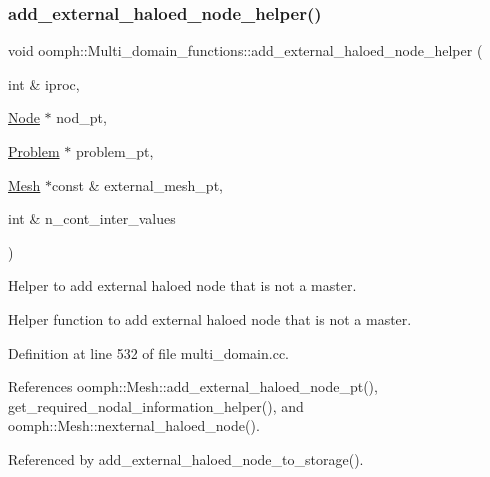 \subsubsection{\texorpdfstring{add\+\_\+external\+\_\+haloed\+\_\+node\+\_\+helper()}{add\_external\_haloed\_node\_helper()}}
{\footnotesize\ttfamily void oomph\+::\+Multi\+\_\+domain\+\_\+functions\+::add\+\_\+external\+\_\+haloed\+\_\+node\+\_\+helper (\begin{DoxyParamCaption}\item[{int \&}]{iproc,  }\item[{\hyperlink{classoomph_1_1Node}{Node} $\ast$}]{nod\+\_\+pt,  }\item[{\hyperlink{classoomph_1_1Problem}{Problem} $\ast$}]{problem\+\_\+pt,  }\item[{\hyperlink{classoomph_1_1Mesh}{Mesh} $\ast$const \&}]{external\+\_\+mesh\+\_\+pt,  }\item[{int \&}]{n\+\_\+cont\+\_\+inter\+\_\+values }\end{DoxyParamCaption})}



Helper to add external haloed node that is not a master. 

Helper function to add external haloed node that is not a master. 

Definition at line 532 of file multi\+\_\+domain.\+cc.



References oomph\+::\+Mesh\+::add\+\_\+external\+\_\+haloed\+\_\+node\+\_\+pt(), get\+\_\+required\+\_\+nodal\+\_\+information\+\_\+helper(), and oomph\+::\+Mesh\+::nexternal\+\_\+haloed\+\_\+node().



Referenced by add\+\_\+external\+\_\+haloed\+\_\+node\+\_\+to\+\_\+storage().

\mbox{\label{namespaceoomph_1_1Multi__domain__functions_aea9c2b1984158b8f560c6fff7c0adea7}} 
